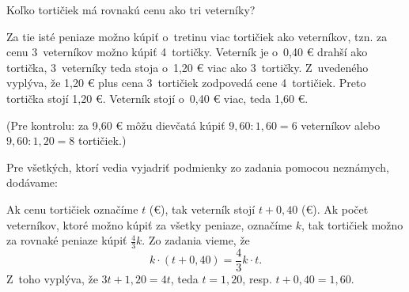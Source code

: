 {%
\napad
Koľko tortičiek má rovnakú cenu ako tri veterníky?

\riesenie
Za tie isté peniaze možno kúpiť o~tretinu viac tortičiek ako veterníkov, tzn. za cenu 3~veterníkov možno kúpiť 4~tortičky.
Veterník je o~0,40 € drahší ako tortička, 3~veterníky teda stoja o~1,20 € viac ako 3~tortičky.
Z~uvedeného vyplýva, že 1,20 € plus cena 3~tortičiek zodpovedá cene 4~tortičiek.
Preto tortička stojí 1,20 €.
Veterník stojí o~0,40 € viac, teda 1,60 €.

(Pre kontrolu: za 9,60 € môžu dievčatá kúpiť $9{,}60:1{,}60=6$ veterníkov alebo $9{,}60:1{,}20=8$ tortičiek.)

\poznamka
Pre všetkých, ktorí vedia vyjadriť podmienky zo zadania pomocou neznámych, dodávame:

Ak cenu tortičiek označíme $t$ (\euro), tak veterník stojí $t+0{,}40$ (\euro).
Ak počet veterníkov, ktoré možno kúpiť za všetky peniaze, označíme $k$, tak tortičiek možno za rovnaké peniaze kúpiť $\frac43k$.
Zo zadania vieme, že
$$
k\cdot(t+0{,}40)=\frac43k\cdot t.
$$
Z~toho vyplýva, že $3t+1{,}20=4t$, teda $t=1{,}20$, resp. $t+0{,}40=1{,}60$.
}


